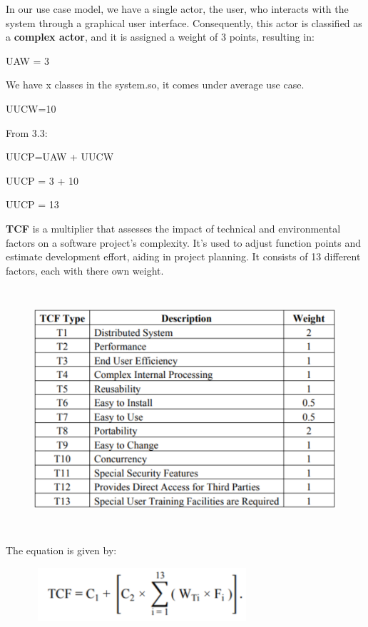 {\normalsize{In our use case model, we have a single actor, the user, who interacts with the system through a graphical user interface. Consequently, this actor is classified as a \textbf{complex actor}, and it is assigned a weight of 3 points, resulting in:}

\normalsize{\centerline{UAW = 3}}
\hfill\break

\normalsize{We have x classes in the system.so, it comes under average use case.}
\centerline{UUCW=10}
\normalsize{From 3.3:}
\normalsize{\centerline{UUCP=UAW + UUCW}
\centerline{UUCP = 3 + 10}
\centerline{UUCP = 13}
\hfill\break

\normalsize{\textbf{TCF} is a multiplier that assesses the impact of technical and environmental factors on a software project's complexity. It's used to adjust function points and estimate development effort, aiding in project planning. It consists of 13 different factors, each with there own weight.}


\label{sec: Figure 6}
\begin{figure}[htp]
    \centering
    \includegraphics[width=15cm, height=9cm]{p6.png}
    \label{fig:Figure 6}
\end{figure}

\pagebreak

\normalsize{The equation is given by:}

\label{sec: Figure 7}
\begin{figure}[htp]
    \centering
    \includegraphics[width=8cm, height=2cm]{p7.png}
    \label{fig:Figure 7}
\end{figure}

}}
